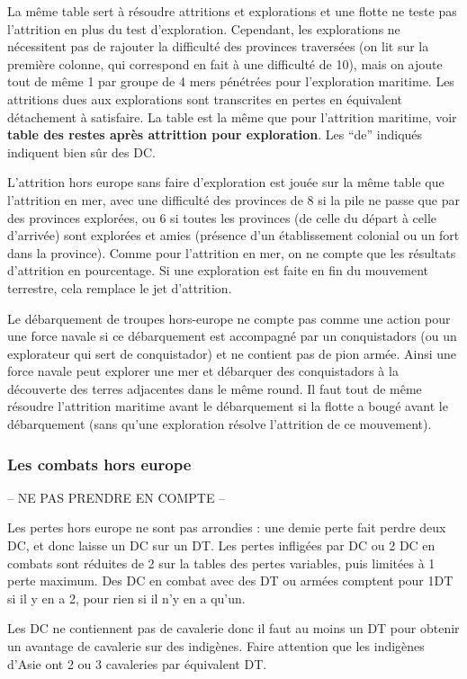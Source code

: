 La même table sert à résoudre attritions et explorations et une flotte
ne teste pas l'attrition en plus du test d'exploration. Cependant,
les explorations ne nécessitent pas de rajouter la difficulté des
provinces traversées (on lit sur la première colonne, qui correspond en
fait à une difficulté de 10), mais on ajoute tout de même 1 par groupe de
4 mers pénétrées pour l'exploration maritime.
Les attritions dues aux explorations
sont transcrites en pertes en équivalent détachement à satisfaire. La table
est la même que pour l'attrition maritime, voir \textbf{table des restes après
attrittion pour exploration}. Les ``de'' indiqués indiquent bien sûr des DC.

L'attrition hors europe sans faire d'exploration est jouée sur la même table
que l'attrition en mer, avec une difficulté des provinces de 8 si la pile ne passe
que par des provinces explorées, ou 6 si toutes les provinces (de celle du
départ à celle d'arrivée) sont explorées et amies (présence d'un établissement
colonial ou un fort dans la province).
Comme pour l'attrition en mer, on ne compte que les résultats d'attrition en
pourcentage.
Si une exploration est faite en fin du mouvement terrestre, cela remplace le jet d'attrition.

Le débarquement de troupes hors-europe ne compte pas comme une action
pour une force navale si ce débarquement est accompagné par un
conquistadors (ou un explorateur qui sert de conquistador) et ne contient pas
de pion armée. Ainsi une force navale peut explorer une mer et débarquer
des conquistadors à la découverte des terres adjacentes dans le même round.
Il faut tout de même résoudre l'attrition maritime avant le débarquement si
la flotte a bougé avant le débarquement (sans qu'une exploration résolve
l'attrition de ce mouvement).

\subsubsection{Les combats hors europe}
-- NE PAS PRENDRE EN COMPTE --

Les pertes hors europe ne sont pas arrondies : une demie perte fait perdre deux DC,
et donc laisse un DC sur un DT. Les pertes infligées par DC ou 2 DC en combats sont
réduites de 2 sur la tables des pertes variables, puis limitées à 1 perte maximum.
Des DC en combat avec des DT ou armées comptent pour 1DT  si il y en a 2,
pour rien si il n'y en a qu'un.

Les DC ne contiennent pas de cavalerie donc il faut au moins un DT
pour obtenir un avantage de cavalerie sur des indigènes. Faire attention
que les indigènes d'Asie ont 2 ou 3 cavaleries par équivalent DT.

